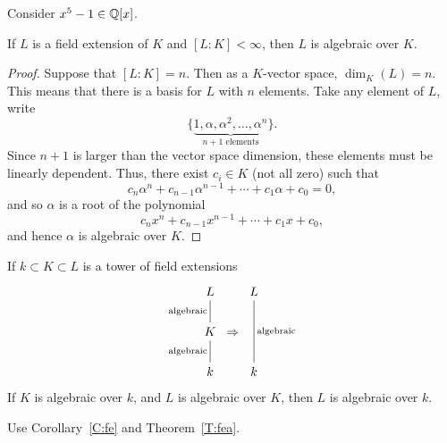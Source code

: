 \documentclass{ximera}
\begin{document}
\begin{example}
  Consider $x^5-1 \in \mathbb Q[x]$.
\end{example}

\begin{theorem}\label{T:fea}
  If $L$ is a field extension of $K$ and $[L:K]<\infty$, then $L$ is
  algebraic over $K$.
  \begin{proof}
    Suppose that $[L:K]=n$. Then as a $K$-vector space, $\dim_K(L) =
    n$. This means that there is a basis for $L$ with $n$
    elements. Take any element of $L$, write
    \[
    \{ \underbrace{1, \alpha, \alpha^2 ,\dots, \alpha^n}_{\text{$n+1$ elements}}\}.
    \]
    Since $n+1$ is larger than the vector space dimension, these
    elements must be linearly dependent. Thus, there exist $c_i\in K$ (not
    all zero) such that
    \[
    c_n\alpha^n + c_{n-1}\alpha^{n-1} + \cdots + c_1\alpha + c_0 = 0,
    \]
    and so $\alpha$ is a root of the polynomial
    \[
    c_n x^n + c_{n-1}x^{n-1} + \cdots + c_1 x + c_0,
    \]
    and hence $\alpha$ is algebraic over $K$.
  \end{proof}
\end{theorem}


\begin{corollary}\label{C:feac}
  If $k\subset K\subset L$ is a tower of field extensions
  \[
  \begin{tikzcd}[column sep=0pt]
    L\ar[d,-,"\text{algebraic}",swap] & & L\ar[dd,-,"\text{algebraic}"]\\
    K \ar[d,-,"\text{algebraic}",swap] & \Rightarrow& \\
    k & \vphantom{K} & k
  \end{tikzcd}
  \]
  If $K$ is algebraic over $k$, and $L$ is algebraic over $K$, then $L$
  is algebraic over $k$.
  \begin{sketch}
    Use Corollary~\ref{C:fe} and Theorem~\ref{T:fea}.
  \end{sketch}
\end{corollary}



\end{document}
